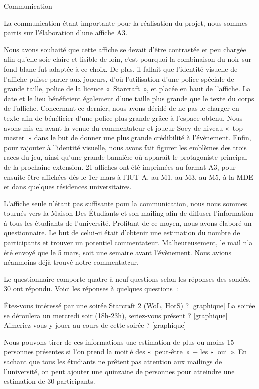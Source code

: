 Communication

	La communication étant importante pour la réalisation du projet, nous sommes partis sur l'élaboration d'une affiche A3.

	Nous avons souhaité que cette affiche se devait d’être contrastée et peu chargée afin qu’elle soie claire et lisible de loin, c’est pourquoi la combinaison du noir sur fond blanc fut adaptée à ce choix. 
	De plus, il fallait que l’identité visuelle de l’affiche puisse parler aux joueurs, d’où l’utilisation d’une police spéciale de grande taille, police de la licence « Starcraft », et placée en haut de l’affiche.
La date et le lieu bénéficient également d’une taille plus grande que le texte du corps de l’affiche.
	Concernant ce dernier, nous avons décidé de ne pas le charger en texte afin de bénéficier d’une police plus grande grâce à l’espace obtenu.
Nous avons mis en avant la venue du commentateur et joueur Soey  de niveau « top master »  dans le but de donner une plus grande crédibilité à l’évènement. 
	Enfin, pour rajouter à l’identité visuelle, nous avons fait figurer  les emblèmes des trois races du jeu, ainsi qu’une grande bannière où apparaît le protagoniste principal de la prochaine extension.
	21 affiches ont été imprimées au format A3, pour ensuite être affichées dès le 1er mars à l’IUT A, au M1, au M3, au M5, à la MDE et dans quelques résidences universitaires.

	L’affiche seule n’étant pas suffisante pour la communication, nous nous sommes tournés vers la Maison Des Étudiants et son mailing afin de diffuser l’information à tous les étudiants de l’université.
	Profitant de ce moyen, nous avons élaboré un questionnaire. Le but de celui-ci était d’obtenir une estimation du nombre de participants et trouver un potentiel commentateur.
Malheureusement, le mail n’a été envoyé que le 5 mars, soit une semaine avant l’évènement.
Nous avions néanmoins déjà trouvé notre commentateur.

Le questionnaire comporte quatre à neuf questions selon les réponses des sondés. 30 ont répondu.
Voici les réponses à quelques questions :


Êtes-vous intéressé par une soirée Starcraft 2 (WoL, HotS) ?
[graphique]
La soirée se déroulera un mercredi soir (18h-23h), seriez-vous présent ?
[graphique]
Aimeriez-vous y jouer au cours de cette soirée ?
[graphique]

	Nous pouvons tirer de ces informations une estimation de plus ou moins 15 personnes présentes si l’on prend la moitié des « peut-être » + les « oui ». En sachant que tous les étudiants ne prêtent pas attention aux mailings de l’université, on peut ajouter une quinzaine de personnes pour atteindre une estimation de 30 participants.
